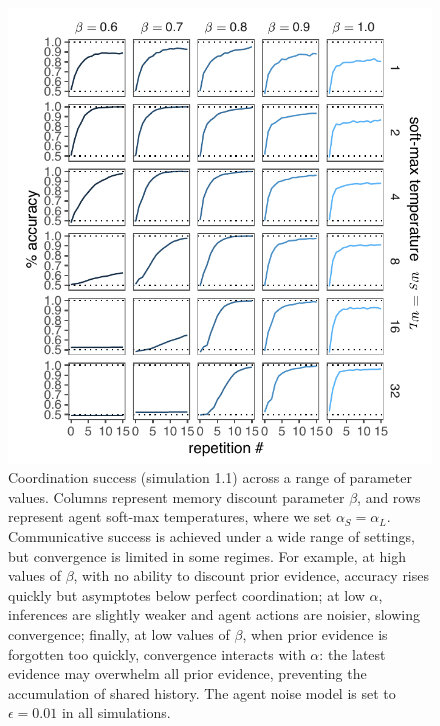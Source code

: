 \documentclass[11pt, floatsintext]{apa6}
\begin{document}
 \begin{figure}
\centering
    \includegraphics[scale=1.2]{arbitrariness_grid.pdf}
  \caption{Coordination success (simulation 1.1) across a range of parameter values. Columns represent memory discount parameter $\beta$, and rows represent agent soft-max temperatures, where we set $\alpha_S=\alpha_L$. Communicative success is achieved under a wide range of settings, but convergence is limited in some regimes. For example, at high values of $\beta$, with no ability to discount prior evidence, accuracy rises quickly but asymptotes below perfect coordination; at low $\alpha$, inferences are slightly weaker and agent actions are noisier, slowing convergence; finally, at low values of $\beta$, when prior evidence is forgotten too quickly, convergence interacts with $\alpha$: the latest evidence may overwhelm all prior evidence, preventing the accumulation of shared history. The agent noise model is set to $\epsilon = 0.01$ in all simulations.}
  \label{fig:arbitrariness_grid}
\end{figure}
\end{document}
